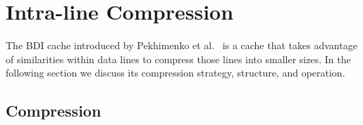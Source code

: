 
\section{Intra-line Compression}
\label{sec:BDI}
The BDI cache introduced by Pekhimenko et al.~\cite{bdi} is a cache that takes advantage of similarities within data lines to compress those lines into smaller sizes. In the following section we discuss its compression strategy, structure, and operation.
\subsection{Compression}
\label{Compression}
